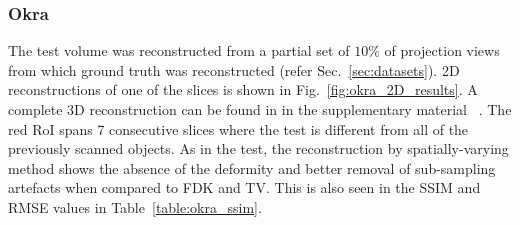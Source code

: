 \documentclass[journal]{IEEEtran}
\begin{document}
\subsubsection{\textbf{Okra}}
\label{Sec:okra_spatially_varying}
The test volume was reconstructed from a partial set of $10\%$ of projection views from which
ground truth was reconstructed (refer Sec.~\ref{sec:datasets}). 2D reconstructions of one of the
slices is shown in Fig.~\ref{fig:okra_2D_results}. A complete 3D
reconstruction can be found in in the supplementary material
~\cite{supp_paper}. The red RoI spans 7 consecutive slices where the
test is different from all of the previously scanned objects. %
As in the test, the
reconstruction by spatially-varying method shows the absence of the
deformity and better removal of sub-sampling artefacts when compared
to FDK and TV. This is also seen in the SSIM and RMSE values in
Table~\ref{table:okra_ssim}.
\end{document}
